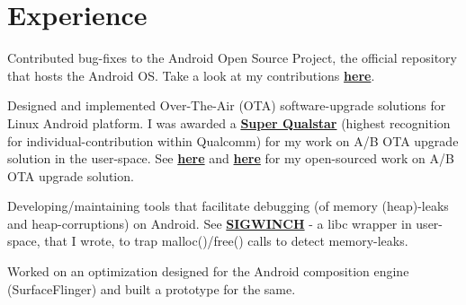 \documentclass[]{deedy-resume-openfont}
\begin{document}
\hfill
\begin{minipage}[t]{0.66\textwidth} 


\section{Experience}
\vspace{\topsep} %
\begin{tightemize}
\item Contributed bug-fixes to the Android Open Source Project, the official repository that hosts the Android OS. Take a look at my contributions \textbf{\href{https://android-review.googlesource.com/q/shibing}{here}}.
\item Designed and implemented Over-The-Air (OTA) software-upgrade solutions for Linux Android platform. I was awarded a \textbf{\href{https://www.slideshare.net/slideshow/embed_code/key/uhvsweQaLamkiG} {Super Qualstar}} (highest recognition for individual-contribution within Qualcomm) for my work on A/B OTA upgrade solution in the user-space. See \textbf{\href{https://source.codeaurora.org/quic/le/OTA/recovery/commit/?h=le-ota.lnx.1.0&id=456b969dcee2cd5e0a7ef1a480797e6eeca550fc}{here}} and \textbf{\href{https://source.codeaurora.org/quic/le/OTA/build/commit/?h=le-ota.lnx.1.0&id=4bb1fdf392bd403f3c2bb2962d210308e4463370}{here}} for my open-sourced work on A/B OTA upgrade solution.
\item Developing/maintaining tools that facilitate debugging (of memory (heap)-leaks and heap-corruptions) on Android. See \textbf{\href{https://source.codeaurora.org/quic/la/platform/bionic/commit/?h=android-framework.lnx.3.1&id=0c0fee17b7f39e841f6ef5d305adb1d5189dfb25}{SIGWINCH}} - a libc wrapper in user-space, that I wrote, to trap malloc()/free() calls to detect memory-leaks.
\end{tightemize}
\sectionsep

\vspace{\topsep} %
\begin{tightemize}
\item Worked on an optimization designed for the Android composition engine (SurfaceFlinger) and built a prototype for the same.
\end{tightemize}
\sectionsep


\end{minipage}
\end{document}
